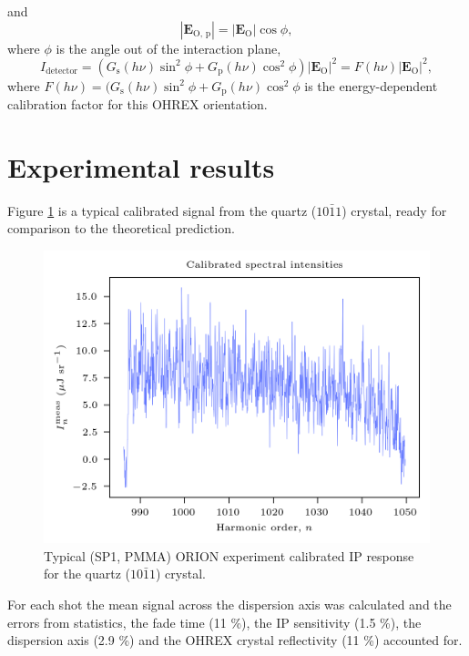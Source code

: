and
\begin{equation}
	|\mathbf{E}_\mathrm{O,\, p}| = |\mathbf{E_\mathrm{O}}|\cos\phi,
\end{equation}
where $\phi$ is the angle out of the interaction plane,
\begin{equation}
	I_\mathrm{detector} = (G_\mathrm{s}(h\nu)\sin^2\phi + G_\mathrm{p}(h\nu)\cos^2\phi)|\mathbf{E_\mathrm{O}}|^2 = F(h\nu)|\mathbf{E_\mathrm{O}}|^2,
\end{equation}
where $F(h\nu) =  (G_\mathrm{s}(h\nu)\sin^2\phi + G_\mathrm{p}(h\nu)\cos^2\phi$ is the energy-dependent calibration factor for this OHREX orientation.

\section{\label{ch:3-sec:results}Experimental results}

Figure \ref{fig:orionq1011} is a typical calibrated signal from the quartz ($10\bar{1}1$) crystal, ready for comparison to the theoretical prediction.
\begin{figure}
	\centering
	\includegraphics[width=0.7\linewidth]{figures/orion/orion_q1011}
	\caption[Typical ORION experiment calibrated IP response for the quartz ($10\bar{1}1$) crystal.]{Typical (SP1, PMMA) ORION experiment calibrated IP response for the quartz ($10\bar{1}1$) crystal.}
	\label{fig:orionq1011}
\end{figure}
For each shot the mean signal across the dispersion axis was calculated and the errors from statistics, the fade time (11 \%), the IP sensitivity (1.5 \%), the dispersion axis (2.9 \%) and the OHREX crystal reflectivity (11 \%) accounted for.

